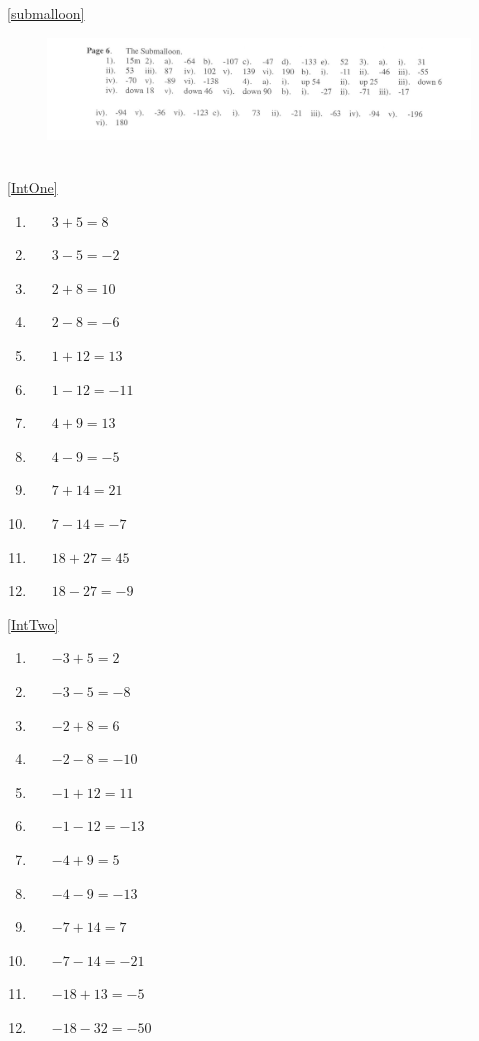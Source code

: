 \documentclass[a4paper,12pt]{article}
\begin{document}
\ref{submalloon}
\begin{figure}[!h]
	\centering
	\includegraphics[width=18cm]{Submalloon_solutions}
\end{figure}\\
\ref{IntOne}
	\begin{multicols}{3}
		\begin{enumerate}[label=\footnotesize \roman*)]
			\item~~~$3+5=8$
			\item~~~$3-5=-2$
			\item~~~$2+8=10$
			\item~~~$2-8=-6$
			\item~~~$1+12=13$
			\item~~~$1-12=-11$
			\item~~~$4+9=13$
			\item~~~$4-9=-5$
			\item~~~$7+14=21$
			\item~~~$7-14=-7$
			\item~~~$18+27=45$
			\item~~~$18-27=-9$
		\end{enumerate}
	\end{multicols}
\ref{IntTwo}
	\begin{multicols}{3}
		\begin{enumerate}[label=\footnotesize \roman*)]
			\item~~~$-3+5=2$
			\item~~~$-3-5=-8$
			\item~~~$-2+8=6$
			\item~~~$-2-8=-10$
			\item~~~$-1+12=11$
			\item~~~$-1-12=-13$
			\item~~~$-4+9=5$
			\item~~~$-4-9=-13$
			\item~~~$-7+14=7$
			\item~~~$-7-14=-21$
			\item~~~$-18+13=-5$
			\item~~~$-18-32=-50$
		\end{enumerate}
	\end{multicols}
\end{document}
